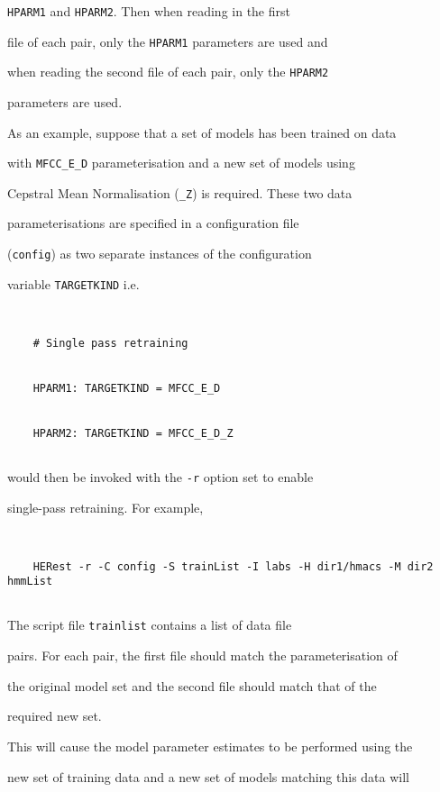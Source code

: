 \texttt{HPARM1} and \texttt{HPARM2}.  Then when reading in the first


file of each pair, only the \texttt{HPARM1} parameters are used and


when reading the second file of each pair, only the \texttt{HPARM2}


parameters are used.





As an example, suppose that a set of models has been trained on data


with \texttt{MFCC\_E\_D} parameterisation and a new set of models using


Cepstral Mean Normalisation (\texttt{\_Z}) is required. These two data


parameterisations are specified in a configuration file


(\texttt{config}) as two separate instances of the configuration


variable \texttt{TARGETKIND} i.e.


\begin{verbatim}


    # Single pass retraining


    HPARM1: TARGETKIND = MFCC_E_D


    HPARM2: TARGETKIND = MFCC_E_D_Z


\end{verbatim}


 would then be invoked with the \texttt{-r} option set to enable 


single-pass retraining. For example,


\begin{verbatim}


    HERest -r -C config -S trainList -I labs -H dir1/hmacs -M dir2 hmmList


\end{verbatim}


The script file  \texttt{trainlist} contains a list of data file


pairs. For each pair, the first file should match the parameterisation of 


the original model set and the second file should match that of the


required new set.


This will cause the model parameter estimates to be performed using the 


new set of training data and a new set of models matching this data will  


